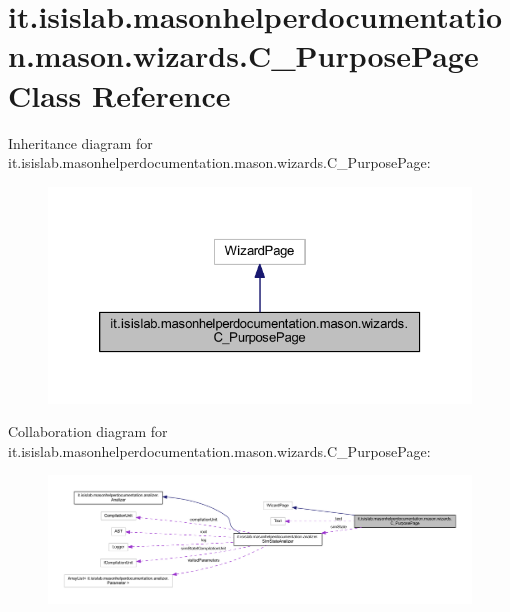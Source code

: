 \hypertarget{classit_1_1isislab_1_1masonhelperdocumentation_1_1mason_1_1wizards_1_1_c___purpose_page}{\section{it.\-isislab.\-masonhelperdocumentation.\-mason.\-wizards.\-C\-\_\-\-Purpose\-Page Class Reference}
\label{classit_1_1isislab_1_1masonhelperdocumentation_1_1mason_1_1wizards_1_1_c___purpose_page}
}


Inheritance diagram for it.\-isislab.\-masonhelperdocumentation.\-mason.\-wizards.\-C\-\_\-\-Purpose\-Page\-:\nopagebreak
\begin{figure}[H]
\begin{center}
\leavevmode
\includegraphics[width=326pt]{classit_1_1isislab_1_1masonhelperdocumentation_1_1mason_1_1wizards_1_1_c___purpose_page__inherit__graph}
\end{center}
\end{figure}


Collaboration diagram for it.\-isislab.\-masonhelperdocumentation.\-mason.\-wizards.\-C\-\_\-\-Purpose\-Page\-:\nopagebreak
\begin{figure}[H]
\begin{center}
\leavevmode
\includegraphics[width=350pt]{classit_1_1isislab_1_1masonhelperdocumentation_1_1mason_1_1wizards_1_1_c___purpose_page__coll__graph}
\end{center}
\end{figure}

